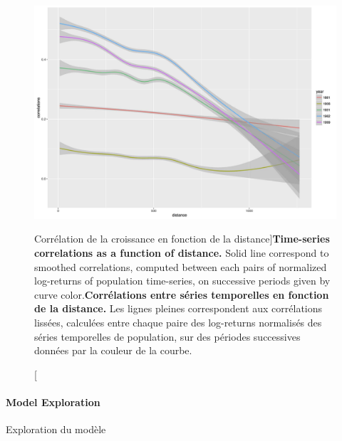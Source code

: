 \begin{figure}
\includegraphics[width=\linewidth]{Figures/Final/4-3-2-fig-interactiongibrat-ts-correlations}
\caption[Time-series correlations][Corrélation de la croissance en fonction de la distance]{\textbf{Time-series correlations as a function of distance.} Solid line correspond to smoothed correlations, computed between each pairs of normalized log-returns of population time-series, on successive periods given by curve color.\label{fig:interactiongibrat:ts-correlations}}{\textbf{Corrélations entre séries temporelles en fonction de la distance.} Les lignes pleines correspondent aux corrélations lissées, calculées entre chaque paire des log-returns normalisés des séries temporelles de population, sur des périodes successives données par la couleur de la courbe.\label{fig:interactiongibrat:ts-correlations}}
\end{figure}





\paragraph{Model Exploration}{Exploration du modèle}




